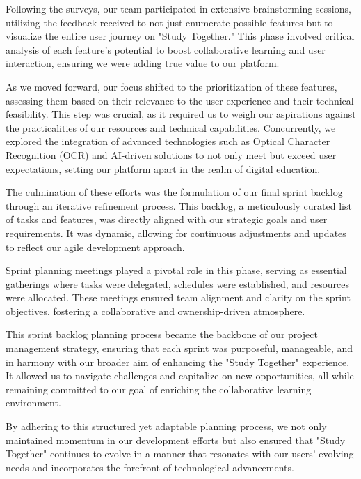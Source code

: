 Following the surveys, our team participated in extensive brainstorming sessions, utilizing the feedback received to not just enumerate possible features but to visualize the entire user journey on "Study Together." This phase involved critical analysis of each feature's potential to boost collaborative learning and user interaction, ensuring we were adding true value to our platform.

As we moved forward, our focus shifted to the prioritization of these features, assessing them based on their relevance to the user experience and their technical feasibility. This step was crucial, as it required us to weigh our aspirations against the practicalities of our resources and technical capabilities. Concurrently, we explored the integration of advanced technologies such as Optical Character Recognition (OCR) and AI-driven solutions to not only meet but exceed user expectations, setting our platform apart in the realm of digital education.

The culmination of these efforts was the formulation of our final sprint backlog through an iterative refinement process. This backlog, a meticulously curated list of tasks and features, was directly aligned with our strategic goals and user requirements. It was dynamic, allowing for continuous adjustments and updates to reflect our agile development approach.

Sprint planning meetings played a pivotal role in this phase, serving as essential gatherings where tasks were delegated, schedules were established, and resources were allocated. These meetings ensured team alignment and clarity on the sprint objectives, fostering a collaborative and ownership-driven atmosphere.

This sprint backlog planning process became the backbone of our project management strategy, ensuring that each sprint was purposeful, manageable, and in harmony with our broader aim of enhancing the "Study Together" experience. It allowed us to navigate challenges and capitalize on new opportunities, all while remaining committed to our goal of enriching the collaborative learning environment.

By adhering to this structured yet adaptable planning process, we not only maintained momentum in our development efforts but also ensured that "Study Together" continues to evolve in a manner that resonates with our users' evolving needs and incorporates the forefront of technological advancements.

